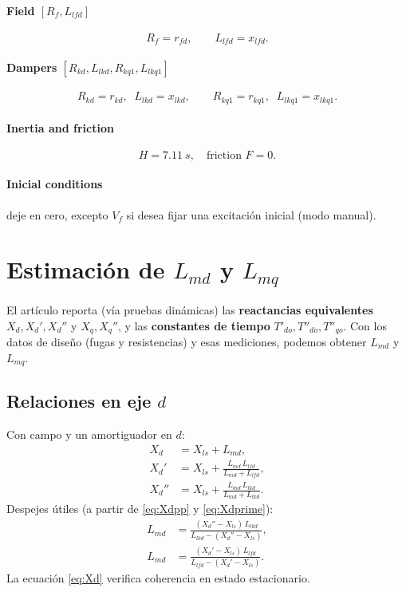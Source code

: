 \documentclass[11pt]{article}
\begin{document}
\paragraph{Field \([R_f, L_{lfd}]\)}
\[
R_f=r_{fd},\qquad L_{lfd}=x_{lfd}.
\]

\paragraph{Dampers \([R_{kd}, L_{lkd}, R_{kq1}, L_{lkq1}]\)}
\[
R_{kd}=r_{kd},\;\; L_{lkd}=x_{lkd},\qquad R_{kq1}=r_{kq1},\;\; L_{lkq1}=x_{lkq1}.
\]

\paragraph{Inertia and friction}
\[
H=\SI{7.11}{s},\quad \text{friction }F=0.
\]

\paragraph{Inicial conditions} deje en cero, excepto \(V_f\) si desea fijar una excitaci\'on inicial (modo manual).

\section{Estimaci\'on de \(L_{md}\) y \(L_{mq}\)}
El art\'iculo reporta (v\'ia pruebas din\'amicas) las \textbf{reactancias equivalentes} \(X_d,X_d',X_d''\) y \(X_q,X_q''\), y las \textbf{constantes de tiempo} \(T'_{do},T''_{do},T''_{qo}\).
Con los datos de dise\~no (fugas y resistencias) y esas mediciones, podemos obtener \(L_{md}\) y \(L_{mq}\).

\subsection*{Relaciones en eje \(d\)}
Con campo y un amortiguador en \(d\):
\begin{align}
X_d      &= X_{ls} + L_{md},\label{eq:Xd}\\
X_d'     &= X_{ls} + \frac{L_{md}\,L_{lfd}}{L_{md}+L_{lfd}},\label{eq:Xdprime}\\
X_d''    &= X_{ls} + \frac{L_{md}\,L_{lkd}}{L_{md}+L_{lkd}}.\label{eq:Xdpp}
\end{align}
Despejes \'utiles (a partir de \eqref{eq:Xdpp} y \eqref{eq:Xdprime}):
\begin{align}
L_{md} &= \frac{(X_d''-X_{ls})\,L_{lkd}}{L_{lkd}-(X_d''-X_{ls})},\label{eq:Lmd1}\\
L_{md} &= \frac{(X_d'-X_{ls})\,L_{lfd}}{L_{lfd}-(X_d'-X_{ls})}.\label{eq:Lmd2}
\end{align}
La ecuaci\'on \eqref{eq:Xd} verifica coherencia en estado estacionario.
\end{document}
